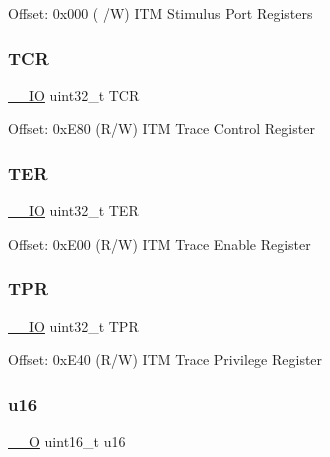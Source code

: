 Offset\+: 0x000 ( /W) I\+TM Stimulus Port Registers \mbox{\label{struct_i_t_m___type_ae9dd9282fab299d0cd6e119564688e53}} 
\subsubsection{\texorpdfstring{T\+CR}{TCR}}
{\footnotesize\ttfamily \mbox{\hyperlink{core__cm3_8h_aec43007d9998a0a0e01faede4133d6be}{\+\_\+\+\_\+\+IO}} uint32\+\_\+t T\+CR}

Offset\+: 0x\+E80 (R/W) I\+TM Trace Control Register \mbox{\label{struct_i_t_m___type_a8ffb3c6b706b03334f6fe37ef5d8b165}} 
\subsubsection{\texorpdfstring{T\+ER}{TER}}
{\footnotesize\ttfamily \mbox{\hyperlink{core__cm3_8h_aec43007d9998a0a0e01faede4133d6be}{\+\_\+\+\_\+\+IO}} uint32\+\_\+t T\+ER}

Offset\+: 0x\+E00 (R/W) I\+TM Trace Enable Register \mbox{\label{struct_i_t_m___type_a72bb9b7d61fe3262cd2a6070a7bd5b69}} 
\subsubsection{\texorpdfstring{T\+PR}{TPR}}
{\footnotesize\ttfamily \mbox{\hyperlink{core__cm3_8h_aec43007d9998a0a0e01faede4133d6be}{\+\_\+\+\_\+\+IO}} uint32\+\_\+t T\+PR}

Offset\+: 0x\+E40 (R/W) I\+TM Trace Privilege Register \mbox{\label{struct_i_t_m___type_ae8d499140220fa6d4eab1da7262bf08e}} 
\subsubsection{\texorpdfstring{u16}{u16}}
{\footnotesize\ttfamily \mbox{\hyperlink{core__cm3_8h_a7e25d9380f9ef903923964322e71f2f6}{\+\_\+\+\_\+O}} uint16\+\_\+t u16}

